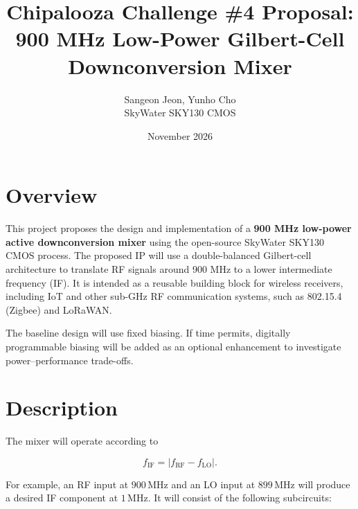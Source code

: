 \documentclass[11pt,letterpaper]{article}
\title{
    \textbf{Chipalooza Challenge \#4 Proposal: 900 MHz Low-Power Gilbert-Cell Downconversion Mixer}
}
\author{
    Sangeon Jeon, Yunho Cho\\
    SkyWater SKY130 CMOS
}
\date{November 2026}
\begin{document}
\maketitle

\section{Overview}

This project proposes the design and implementation of a \textbf{900 MHz low-power active downconversion mixer} using the open-source SkyWater SKY130 CMOS process.
The proposed IP will use a double-balanced Gilbert-cell architecture to translate RF signals around 900 MHz to a lower intermediate frequency (IF). 
It is intended as a reusable building block for wireless receivers, including IoT and other sub-GHz RF communication systems, such as 802.15.4 (Zigbee) and LoRaWAN.


The baseline design will use fixed biasing. 
If time permits, digitally programmable biasing will be added
as an optional enhancement to investigate
power--performance trade-offs.


\section{Description}

The mixer will operate according to

\begin{equation}
    f_{\mathrm{IF}}
    =
    \left|f_{\mathrm{RF}}-f_{\mathrm{LO}}\right|.
\end{equation}

For example, an RF input at \(900\,\mathrm{MHz}\) and an
LO input at \(899\,\mathrm{MHz}\) will produce a desired
IF component at \(1\,\mathrm{MHz}\).
It will consist of the following
subcircuits:
\end{document}
